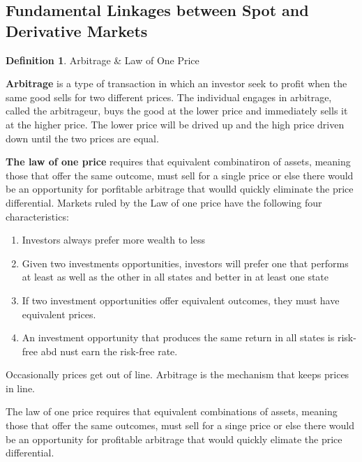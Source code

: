 \documentclass{book}
\theoremstyle{definition}
\newtheorem{definition}{Definition}[section]
\theoremstyle{remark}
\begin{document}
    \subsection{Fundamental Linkages between Spot and Derivative Markets}
        \begin{definition}{Arbitrage \& Law of One Price}
            
            \textbf{Arbitrage} is a type of transaction in which an investor seek to profit when the same good sells for two different prices. The individual engages in arbitrage, called the arbitrageur, buys the good at the lower price and immediately sells it at the higher price. The lower price will be drived up and the high price driven down until the two prices are equal. 
            
            \textbf{The law of one price} requires that equivalent combinatiron of assets, meaning those that offer the same outcome, must sell for a single price or else there would be an opportunity for porfitable arbitrage that woulld quickly eliminate the price differential. Markets ruled by the Law of one price have the following four characteristics: 
                \begin{enumerate}
                    \item Investors always prefer more wealth to less
                    \item Given two investments opportunities, investors will prefer one that performs at least as well as the other in all states and better in at least one state
                    \item If two investment opportunities offer equivalent outcomes, they must have equivalent prices. 
                    \item An investment opportunity that produces the same return in all states is risk-free abd nust earn the risk-free rate. 
                \end{enumerate}
            Occasionally prices get out of line. Arbitrage is the mechanism that keeps prices in line.
        \end{definition}
        
        \begin{tcolorbox}[colback=blue!5!white,colframe=blue!75!black, title=Sticky Note]
            The law of one price requires that equivalent combinations of assets, meaning those that offer the same outcomes, must sell for a singe price or else there would be an opportunity for profitable arbitrage that would quickly elimate the price differential. 
        \end{tcolorbox}        
        
\end{document}
